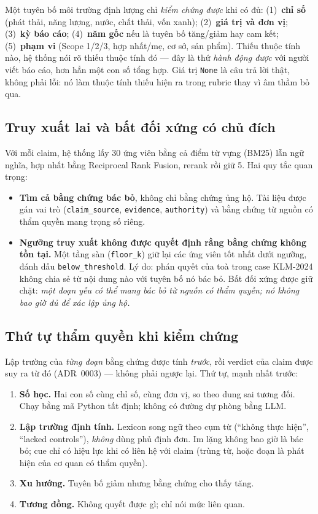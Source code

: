 \documentclass[11pt,a4paper]{article}
\newcommand{\code}[1]{\texttt{#1}}
\begin{document}
Một tuyên bố môi trường định lượng chỉ \emph{kiểm chứng được} khi có đủ: (1)~\textbf{chỉ số} (phát thải, năng lượng, nước, chất thải, vốn xanh); (2)~\textbf{giá trị và đơn vị}; (3)~\textbf{kỳ báo cáo}; (4)~\textbf{năm gốc} nếu là tuyên bố tăng/giảm hay cam kết; (5)~\textbf{phạm vi} (Scope 1/2/3, hợp nhất/mẹ, cơ sở, sản phẩm). Thiếu thuộc tính nào, hệ thống nói rõ thiếu thuộc tính đó — đây là thứ \emph{hành động được} với người viết báo cáo, hơn hẳn một con số tổng hợp. Giá trị \code{None} là câu trả lời thật, không phải lỗi: nó làm thuộc tính thiếu hiện ra trong rubric thay vì âm thầm bỏ qua.

\subsection{Truy xuất lai và bất đối xứng có chủ đích}

Với mỗi claim, hệ thống lấy 30 ứng viên bằng cả điểm từ vựng (BM25) lẫn ngữ nghĩa, hợp nhất bằng Reciprocal Rank Fusion, rerank rồi giữ 5. Hai quy tắc quan trọng:

\begin{itemize}
  \item \textbf{Tìm cả bằng chứng bác bỏ}, không chỉ bằng chứng ủng hộ. Tài liệu được gán vai trò (\code{claim\_source}, \code{evidence}, \code{authority}) và bằng chứng từ nguồn có thẩm quyền mang trọng số riêng.
  \item \textbf{Ngưỡng truy xuất không được quyết định rằng bằng chứng không tồn tại.} Một tầng sàn (\code{floor\_k}) giữ lại các ứng viên tốt nhất dưới ngưỡng, đánh dấu \code{below\_threshold}. Lý do: phán quyết của toà trong case KLM-2024 không chia sẻ từ nội dung nào với tuyên bố nó bác bỏ. Bất đối xứng được giữ chặt: \emph{một đoạn yếu có thể mang bác bỏ từ nguồn có thẩm quyền; nó không bao giờ đủ để xác lập ủng hộ.}
\end{itemize}

\subsection{Thứ tự thẩm quyền khi kiểm chứng}

Lập trường của \emph{từng đoạn} bằng chứng được tính \emph{trước}, rồi verdict của claim được suy ra từ đó (ADR~0003) — không phải ngược lại. Thứ tự, mạnh nhất trước:

\begin{enumerate}
  \item \textbf{Số học.} Hai con số cùng chỉ số, cùng đơn vị, so theo dung sai tương đối. Chạy bằng mã Python tất định; không có đường dự phòng bằng LLM.
  \item \textbf{Lập trường định tính.} Lexicon song ngữ theo cụm từ (``không thực hiện'', ``lacked controls''), \emph{không} dùng phủ định đơn. Im lặng không bao giờ là bác bỏ; cue chỉ có hiệu lực khi có liên hệ với claim (trùng từ, hoặc đoạn là phát hiện của cơ quan có thẩm quyền).
  \item \textbf{Xu hướng.} Tuyên bố giảm nhưng bằng chứng cho thấy tăng.
  \item \textbf{Tương đồng.} Không quyết được gì; chỉ nói mức liên quan.
\end{enumerate}
\end{document}
